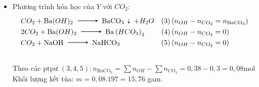 \begin{vd}
{\begin{itemize}
\[\begin{array}{ll}
			\end{array}
			\]
			\\
			Phân tích hệ số ta thấy: $\sum n_{H_2}=0{,}5n_{\mathrm{Na}}+n_{\mathrm{Ba}}-n_O$
			\\
			Bảo toàn số $\mathrm{mol} \mathrm{Ba} \Rightarrow n_{\mathrm{Ba}}=n_{\mathrm{Ba}(OH)_2}=0{,}12\mathrm{mol}$
			\\
			Theo đề ta có: $\left\{\begin{array}{l}23n_{\mathrm{Na}}+16n_O=21{,}9-0{,}12.137\\ 0{,}5n_{\mathrm{Na}}-n_O=0{,}05-0{,}12\end{array}\right.$ $\Rightarrow\left\{\begin{array}{l}n_{\mathrm{Na}}=0{,}14\mathrm{mol} \\ n_O=0{,}14\mathrm{mol}\end{array}\right.$
			\\
			Bảo toàn số $\mathrm{mol} \mathrm{Na} \Rightarrow n_{\mathrm{NaOH}}=0{,}14\mathrm{mol}$
			\\
			Vì $n_{\text{kiềm}}=0{,}26\mathrm{mol} < n_{CO_2}=0{,}3< n_{OH}=0{,}38\mathrm{mol} \Rightarrow$ kết tủa tan một phần.
			\item Phương trình hóa học của $Y$ với $CO_2$:
			\[
			\begin{array}{ll}
				CO_2+\mathrm{Ba}(OH)_2 \xrightarrow \mathrm{BaCO}_3 \downarrow+H_2 O & \text{(3)}\left(n_{OH}-n_{CO_2}=n_{\mathrm{BaCO}_3}\right) \\
				2 CO_2+\mathrm{Ba}(OH)_2 \xrightarrow \mathrm{Ba}\left(HCO_3\right)_2 & \text{(4)}\left(n_{OH}-n_{CO_2}=0\right) \\
				CO_2+\mathrm{NaOH} \xrightarrow \mathrm{NaHCO}_3 & \text{(5)}\left(n_{OH}-n_{CO_2}=0\right)
			\end{array}
			\]
			\\
			Theo các ptpư $(3{,}4,5): n_{\mathrm{BaCO}_3}=\sum n_{OH}-\sum n_{CO_2}=0{,}38-0{,}3=0{,}08\mathrm{mol}$
			\\
			Khối lượng kết tủa: $m=0{,}08.197=15{,}76$ gam.
		\end{itemize}
	}
\end{vd}
